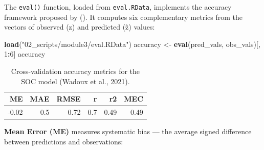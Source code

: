 \documentclass[
  10pt,
  b5paper,
  oneside]{book}
\newenvironment{Shaded}{\begin{snugshade}}{\end{snugshade}}
\newcommand{\DecValTok}[1]{\textcolor[rgb]{0.00,0.00,0.81}{#1}}
\newcommand{\FunctionTok}[1]{\textcolor[rgb]{0.13,0.29,0.53}{\textbf{#1}}}
\newcommand{\NormalTok}[1]{#1}
\newcommand{\OtherTok}[1]{\textcolor[rgb]{0.56,0.35,0.01}{#1}}
\newcommand{\SpecialCharTok}[1]{\textcolor[rgb]{0.81,0.36,0.00}{\textbf{#1}}}
\newcommand{\StringTok}[1]{\textcolor[rgb]{0.31,0.60,0.02}{#1}}
\begin{document}
\begin{Shaded}
\end{Shaded}

The \texttt{eval()} function, loaded from \texttt{eval.RData}, implements the accuracy framework proposed by (). It computes six complementary metrics from the vectors of observed (z) and predicted (ẑ) values:

\begin{Shaded}
\begin{Highlighting}[]
\FunctionTok{load}\NormalTok{(}\StringTok{"02\_scripts/module3/eval.RData"}\NormalTok{)}
\NormalTok{accuracy }\OtherTok{\textless{}{-}} \FunctionTok{eval}\NormalTok{(pred\_vals, obs\_vals)[, }\DecValTok{1}\SpecialCharTok{:}\DecValTok{6}\NormalTok{]}
\NormalTok{accuracy}
\end{Highlighting}
\end{Shaded}

\begin{table}

\caption{\label{tab:accuracy-table}Cross-validation accuracy metrics for the SOC model (Wadoux et al., 2021).}
\centering
\begin{tabular}[t]{r|r|r|r|r|r}
\hline
ME & MAE & RMSE & r & r2 & MEC\\
\hline
-0.02 & 0.5 & 0.72 & 0.7 & 0.49 & 0.49\\
\hline
\end{tabular}
\end{table}

\textbf{Mean Error (ME)} measures systematic bias --- the average signed difference between predictions and observations:
\end{document}
